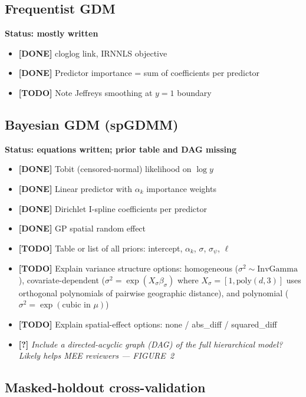 \documentclass[11pt,a4paper]{article}
\newcommand{\done}[1]{{\color{donegreen}\textbf{[DONE]} #1}}
\newcommand{\todo}[1]{{\color{todored}\textbf{[TODO]} #1}}
\newcommand{\question}[1]{{\color{questionblue}\textbf{[?]} \textit{#1}}}
\newenvironment{scaffold}[1]{%
  \begin{mdframed}[backgroundcolor=gray!6, linecolor=gray!30,
                   leftmargin=0pt, rightmargin=0pt,
                   innerleftmargin=8pt, innerrightmargin=8pt,
                   innertopmargin=6pt, innerbottommargin=6pt]
  \noindent\textbf{#1}\par\vspace{2pt}
  \begin{itemize}[leftmargin=1.4em, topsep=2pt, itemsep=1pt, parsep=0pt]
}{%
  \end{itemize}
  \end{mdframed}
  \vspace{4pt}
}
\begin{document}
\subsection{Frequentist GDM}

\begin{scaffold}{Status: mostly written}
  \item \done{cloglog link, IRNNLS objective}
  \item \done{Predictor importance = sum of coefficients per predictor}
  \item \todo{Note Jeffreys smoothing at $y=1$ boundary}
\end{scaffold}

\subsection{Bayesian GDM (spGDMM)}

\begin{scaffold}{Status: equations written; prior table and DAG missing}
  \item \done{Tobit (censored-normal) likelihood on $\log y$}
  \item \done{Linear predictor with $\alpha_k$ importance weights}
  \item \done{Dirichlet I-spline coefficients per predictor}
  \item \done{GP spatial random effect}
  \item \todo{Table or list of all priors: intercept, $\alpha_k$, $\sigma$,
    $\sigma_\psi$, $\ell$}
  \item \todo{Explain variance structure options: homogeneous ($\sigma^2 \sim
    \mathrm{InvGamma}$), covariate-dependent ($\sigma^2 = \exp(X_\sigma
    \beta_\sigma)$ where $X_\sigma = [1, \mathrm{poly}(d, 3)]$ uses
    orthogonal polynomials of pairwise geographic distance), and polynomial
    ($\sigma^2 = \exp(\text{cubic in } \mu)$)}
  \item \todo{Explain spatial-effect options: none / abs\_diff / squared\_diff}
  \item \question{Include a directed-acyclic graph (DAG) of the full
    hierarchical model? Likely helps MEE reviewers --- FIGURE~2}
\end{scaffold}


\subsection{Masked-holdout cross-validation}
\end{document}
